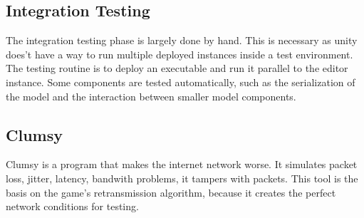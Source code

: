 \documentclass{article}
\begin{document}
\subsection{Integration Testing}
The integration testing phase is largely done by hand. This is necessary as unity does't have a way to run multiple deployed instances inside a test environment. The testing routine is to deploy an executable and run it parallel to the editor instance. Some components are tested automatically, such as the serialization of the model and the interaction between smaller model components.
\subsection{Clumsy \cite{clumsy}}
Clumsy is a program that makes the internet network worse. It simulates packet loss, jitter, latency, bandwith problems, it tampers with packets. This tool is the basis on the game's retransmission algorithm, because it creates the perfect network conditions for testing.

\clearpage


\end{document}

